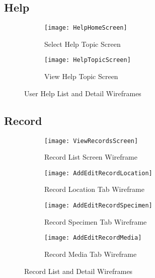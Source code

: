 \documentclass[
10pt, %
a4paper, %
oneside, %
headinclude,footinclude, %
BCOR5mm, %
]{scrartcl}
\begin{document}
\begin{appendices}
\subsection{Help} %
\label{sub:help}

\begin{figure}[h]
\centering
\begin{subfigure}{.5\columnwidth}
  \centering
  \texttt{[image: HelpHomeScreen]}
  \caption{Select Help Topic Screen}
  \label{wire:help_home}
\end{subfigure}%
\begin{subfigure}{.5\columnwidth}
  \centering
  \texttt{[image: HelpTopicScreen]}
  \caption{View Help Topic Screen}
  \label{wire:help_topic}
\end{subfigure}
\caption{User Help List and Detail Wireframes}
\label{wire:help}
\end{figure}


\newpage

\subsection{Record} %
\label{sub:record}

\begin{figure}[h]
\centering
\begin{subfigure}[b]{.475\textwidth}
  \centering
  \texttt{[image: ViewRecordsScreen]}
  \caption{Record List Screen Wireframe}
  \label{wire:records_list}
\end{subfigure}
\begin{subfigure}[b]{.475\textwidth}
  \centering
  \texttt{[image: AddEditRecordLocation]}
  \caption{Record Location Tab Wireframe}
  \label{wire:record_loc}
\end{subfigure}
\quad
\begin{subfigure}[b]{.475\textwidth}
  \centering
  \texttt{[image: AddEditRecordSpecimen]}
  \caption{Record Specimen Tab Wireframe}
  \label{wire:record_specimen}
\end{subfigure}
\begin{subfigure}[b]{.475\textwidth}
  \centering
  \texttt{[image: AddEditRecordMedia]}
  \caption{Record Media Tab Wireframe}
  \label{wire:record_media}
\end{subfigure}
\caption{Record List and Detail Wireframes}
\label{wire:help}
\end{figure}


\end{appendices}
\end{document}
